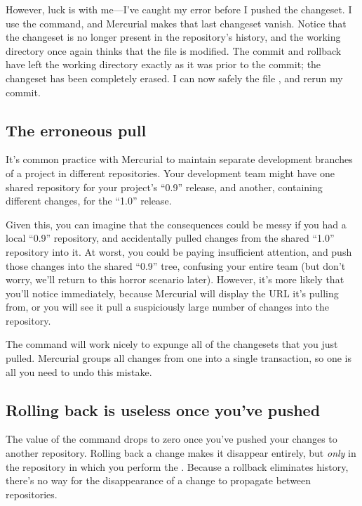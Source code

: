 However, luck is with me---I've caught my error before I pushed the
changeset.  I use the  command, and Mercurial makes
that last changeset vanish.
Notice that the changeset is no longer present in the repository's
history, and the working directory once again thinks that the file
 is modified.  The commit and rollback have left the
working directory exactly as it was prior to the commit; the changeset
has been completely erased.  I can now safely  the file
, and rerun my commit.

\subsection{The erroneous pull}

It's common practice with Mercurial to maintain separate development
branches of a project in different repositories.  Your development
team might have one shared repository for your project's ``0.9''
release, and another, containing different changes, for the ``1.0''
release.

Given this, you can imagine that the consequences could be messy if
you had a local ``0.9'' repository, and accidentally pulled changes
from the shared ``1.0'' repository into it.  At worst, you could be
paying insufficient attention, and push those changes into the shared
``0.9'' tree, confusing your entire team (but don't worry, we'll
return to this horror scenario later).  However, it's more likely that
you'll notice immediately, because Mercurial will display the URL it's
pulling from, or you will see it pull a suspiciously large number of
changes into the repository.

The  command will work nicely to expunge all of the
changesets that you just pulled.  Mercurial groups all changes from
one  into a single transaction, so one  is
all you need to undo this mistake.

\subsection{Rolling back is useless once you've pushed}
\label{sec:undo:rollback-after-push}

The value of the  command drops to zero once you've
pushed your changes to another repository.  Rolling back a change
makes it disappear entirely, but \emph{only} in the repository in
which you perform the .  Because a rollback eliminates
history, there's no way for the disappearance of a change to propagate
between repositories.

